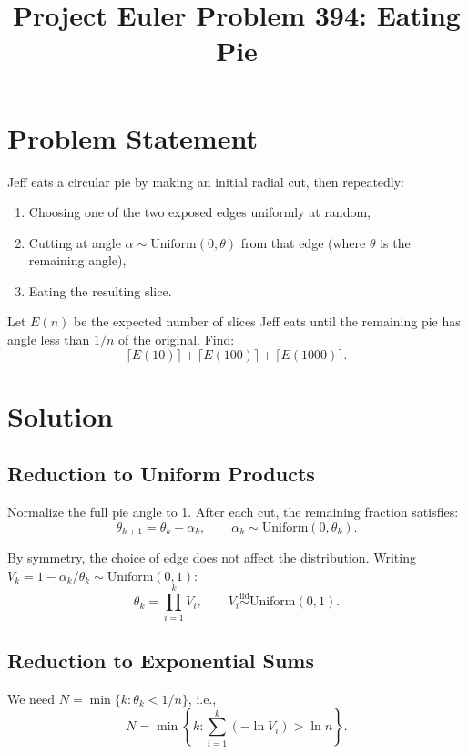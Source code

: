 \documentclass[11pt]{article}
\title{Project Euler Problem 394: Eating Pie}
\author{}
\date{}
\begin{document}
\maketitle

\section{Problem Statement}

Jeff eats a circular pie by making an initial radial cut, then repeatedly:
\begin{enumerate}
    \item Choosing one of the two exposed edges uniformly at random,
    \item Cutting at angle $\alpha \sim \text{Uniform}(0, \theta)$ from that edge (where $\theta$ is the remaining angle),
    \item Eating the resulting slice.
\end{enumerate}

Let $E(n)$ be the expected number of slices Jeff eats until the remaining pie has angle less than $1/n$ of the original. Find:
\[
    \lceil E(10) \rceil + \lceil E(100) \rceil + \lceil E(1000) \rceil.
\]

\section{Solution}

\subsection{Reduction to Uniform Products}

Normalize the full pie angle to 1. After each cut, the remaining fraction satisfies:
\[
    \theta_{k+1} = \theta_k - \alpha_k, \qquad \alpha_k \sim \text{Uniform}(0, \theta_k).
\]

By symmetry, the choice of edge does not affect the distribution. Writing $V_k = 1 - \alpha_k/\theta_k \sim \text{Uniform}(0,1)$:
\[
    \theta_k = \prod_{i=1}^{k} V_i, \qquad V_i \overset{\text{iid}}{\sim} \text{Uniform}(0,1).
\]

\subsection{Reduction to Exponential Sums}

We need $N = \min\{k : \theta_k < 1/n\}$, i.e.,
\[
    N = \min\left\{k : \sum_{i=1}^{k} (-\ln V_i) > \ln n\right\}.
\]
\end{document}
